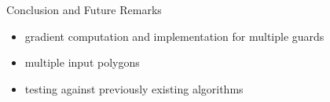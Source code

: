 \documentclass{beamer}
\begin{document}
\begin{frame}{Conclusion and Future Remarks}
	\begin{itemize}
		\item gradient computation and implementation for multiple guards
		\item multiple input polygons
		\item testing against previously existing algorithms \cite{DBLP:journals/corr/abs-2007-06920}
	\end{itemize}
\end{frame}








\end{document}
